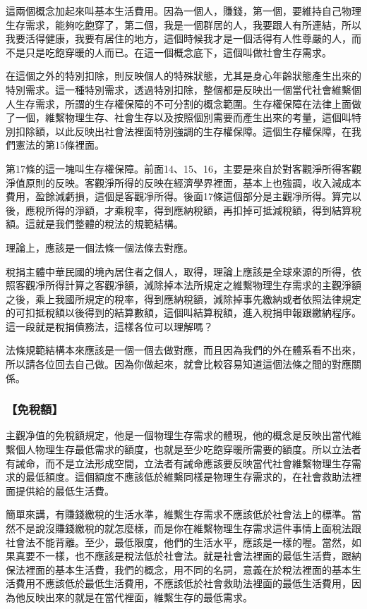 \documentclass[oneside,sub3section]{ctexbook}
\begin{document}
這兩個概念加起來叫基本生活費用。因為一個人，賺錢，第一個，要維持自己物理生存需求，能夠吃飽穿了，第二個，我是一個群居的人，我要跟人有所連結，所以我要活得健康，我要有居住的地方，這個時候我才是一個活得有人性尊嚴的人，而不是只是吃飽穿暖的人而已。在這一個概念底下，這個叫做社會生存需求。

在這個之外的特別扣除，則反映個人的特殊狀態，尤其是身心年齡狀態產生出來的特別需求。這一種特別需求，透過特別扣除，整個都是反映出一個當代社會維繫個人生存需求，所謂的生存權保障的不可分割的概念範圍。生存權保障在法律上面做了一個，維繫物理生存、社會生存以及按照個別需要而產生出來的考量，這個叫特別扣除額，以此反映出社會法裡面特別強調的生存權保障。這個生存權保障，在我們憲法的第15條裡面。

第17條的這一塊叫生存權保障。前面14、15、16，主要是來自於對客觀淨所得客觀淨值原則的反映。客觀淨所得的反映在經濟學界裡面，基本上也強調，收入減成本費用，盈餘減虧損，這個是客觀凈所得。後面17條這個部分是主觀凈所得。算完以後，應稅所得的淨額，才乘稅率，得到應納稅額，再扣掉可抵減稅額，得到結算稅額。這就是我們整體的稅法的規範結構。

理論上，應該是一個法條一個法條去對應。

稅捐主體中華民國的境內居住者之個人，取得，理論上應該是全球來源的所得，依照客觀凈所得計算之客觀凈額，減除掉本法所規定之維繫物理生存需求的主觀淨額之後，乘上我國所規定的稅率，得到應納稅額，減除掉事先繳納或者依照法律規定的可扣抵稅額以後得到的結算數額，這個叫結算稅額，進入稅捐申報跟繳納程序。這一段就是稅捐債務法，這樣各位可以理解嗎？

法條規範結構本來應該是一個一個去做對應，而且因為我們的外在體系看不出來，所以請各位回去自己做。因為你做起來，就會比較容易知道這個法條之間的對應關係。

\hypertarget{ux514dux7a05ux984d}{%
\subsubsection{【免稅額】}\label{ux514dux7a05ux984d}}

主觀净值的免稅額規定，他是一個物理生存需求的體現，他的概念是反映出當代維繫個人物理生存最低需求的額度，也就是至少吃飽穿暖所需要的額度。所以立法者有誡命，而不是立法形成空間，立法者有誡命應該要反映當代社會維繫物理生存需求的最低額度。這個額度不應該低於維繫同樣是物理生存需求的，在社會救助法裡面提供給的最低生活費。

簡單來講，有賺錢繳稅的生活水準，維繫生存需求不應該低於社會法上的標準。當然不是說沒賺錢繳稅的就怎麼樣，而是你在維繫物理生存需求這件事情上面稅法跟社會法不能背離。至少，最低限度，他們的生活水平，應該是一樣的喔。當然，如果真要不一樣，也不應該是稅法低於社會法。就是社會法裡面的最低生活費，跟納保法裡面的基本生活費，我們的概念，用不同的名詞，意義在於稅法裡面的基本生活費用不應該低於最低生活費用，不應該低於社會救助法裡面的最低生活費用，因為他反映出來的就是在當代裡面，維繫生存的最低需求。
\end{document}
